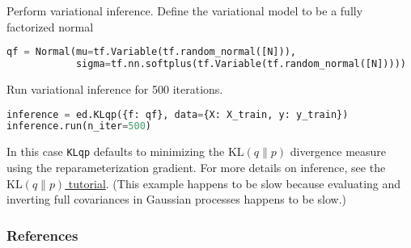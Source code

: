 Perform variational inference.
Define the variational model to be a fully factorized normal
\begin{lstlisting}[language=Python]
qf = Normal(mu=tf.Variable(tf.random_normal([N])),
            sigma=tf.nn.softplus(tf.Variable(tf.random_normal([N]))))
\end{lstlisting}

Run variational inference for 500 iterations.
\begin{lstlisting}[language=Python]
inference = ed.KLqp({f: qf}, data={X: X_train, y: y_train})
inference.run(n_iter=500)
\end{lstlisting}
In this case
\texttt{KLqp} defaults to minimizing the
$\text{KL}(q\|p)$ divergence measure using the reparameterization
gradient.
For more details on inference, see the \href{/tutorials/klqp}{$\text{KL}(q\|p)$ tutorial}.
(This example happens to be slow because evaluating and inverting full
covariances in Gaussian processes happens to be slow.)


\subsubsection{References}\label{references}
